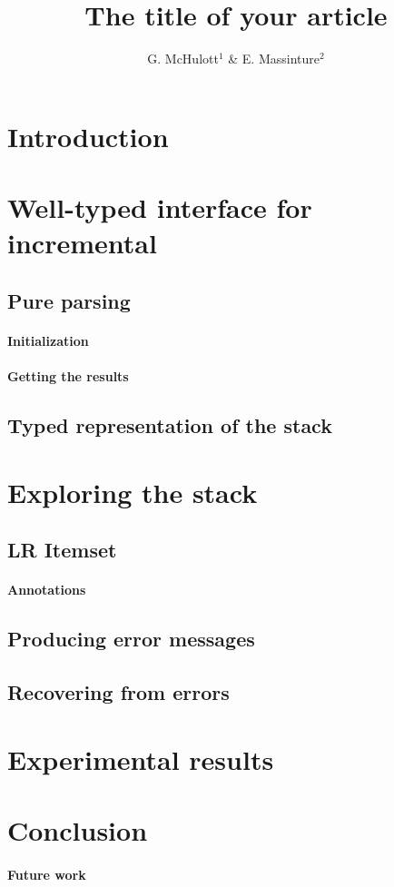 \documentclass[twoside,a4paper]{article}
\title{The title of your article}
\author{G. McHulott$^1$
     \& E. Massinture$^2$}
\affiliation{\begin{tabular}{rr}        %
\\ 1:  Laboratoire d'Informatique de l'\'Ecole UniTechnique,
\\     99999 Petit Oiseau CEDEX, France
\\     {\tt mchulott@info.unitechnique.fr} 
\\ 2:  Universit\'e de Par-ici, CP 6666, Montr\'eal, Qu\'ebec, 
\\     {\tt massinture@uparici.qc}
\end{tabular}}
\begin{document}
\setcounter{page}{1}
\maketitle

\section{Introduction}

\section{Well-typed interface for incremental}

\subsection{Pure parsing}

\paragraph{Initialization}

\paragraph{Getting the results}

\subsection{Typed representation of the stack}

\section{Exploring the stack}

\subsection{LR Itemset}

\paragraph{Annotations}

\subsection{Producing error messages}

\subsection{Recovering from errors}

\section{Experimental results}

\section{Conclusion}

\paragraph{Future work}



                                                                
\end{document}
